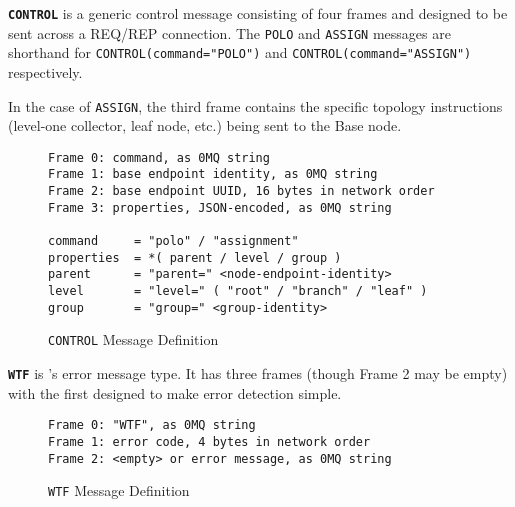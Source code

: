 \textbf{\texttt{CONTROL}} is a generic control message consisting of four frames and designed to be sent across a
REQ/REP connection. The \texttt{POLO} and \texttt{ASSIGN} messages are shorthand for \texttt{CONTROL(command="POLO")}
and \texttt{CONTROL(command="ASSIGN")} respectively.

In the case of \texttt{ASSIGN}, the third frame contains the specific topology instructions (level-one collector, leaf
node, etc.) being sent to the Base node.

\begin{figure}[H]
\vspace{+10pt}
\begin{verbatim}
Frame 0: command, as 0MQ string
Frame 1: base endpoint identity, as 0MQ string
Frame 2: base endpoint UUID, 16 bytes in network order
Frame 3: properties, JSON-encoded, as 0MQ string

command     = "polo" / "assignment"
properties  = *( parent / level / group )
parent      = "parent=" <node-endpoint-identity>
level       = "level=" ( "root" / "branch" / "leaf" )
group       = "group=" <group-identity>
\end{verbatim}
\vspace{-20pt}
\caption{\texttt{CONTROL} Message Definition}
\label{fig:message_control}
\end{figure}

\textbf{\texttt{WTF}} is \dcamp's error message type. It has three frames (though Frame 2 may be empty) with the first
designed to make error detection simple.

\begin{figure}[H]
\vspace{+10pt}
\begin{verbatim}
Frame 0: "WTF", as 0MQ string
Frame 1: error code, 4 bytes in network order
Frame 2: <empty> or error message, as 0MQ string
\end{verbatim}
\vspace{-20pt}
\caption{\texttt{WTF} Message Definition}
\label{fig:message_wtf}
\end{figure}
